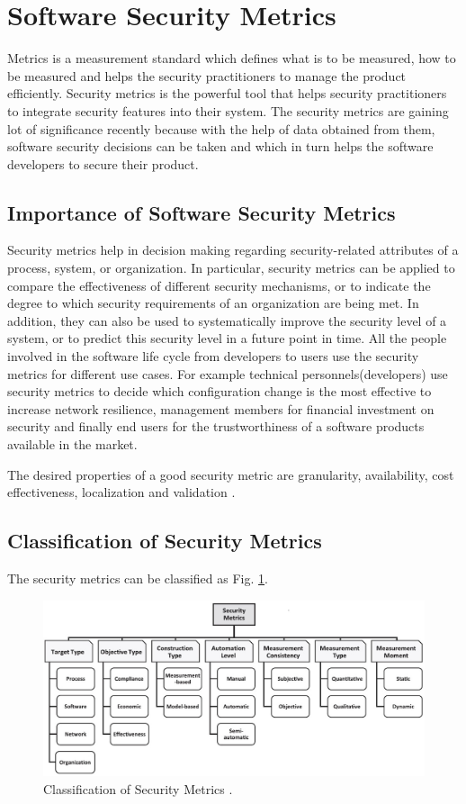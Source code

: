 \documentclass[pdftex,english,oribibl]{llncs}
\begin{document}
\section{Software Security Metrics}\label{sec:softwaremetrics}
Metrics is a measurement standard which defines what is to be measured, how to be measured and helps the security practitioners to manage the product efficiently. Security metrics is the powerful tool that helps security practitioners to integrate security features into their system. The security metrics are gaining lot of significance recently because with the help of data obtained from them, software security decisions can be taken and which in turn helps the software developers to secure their product. 

\subsection{Importance of Software Security Metrics}
Security metrics help in decision making regarding security-related attributes of a process, system, or organization. In particular, security metrics can be applied to compare the effectiveness of different security mechanisms, or to indicate the degree to which security requirements of an organization are being met. In addition, they can also be used to systematically improve the security level of a system, or to predict this security level in a future point in time. All the people involved in the software life cycle from developers to users use the security metrics for different use cases. For example technical personnels(developers) use security metrics to decide which configuration change is the most effective to increase network resilience, management members for financial investment on security and finally end users for the trustworthiness of a software products available in the market.

The desired properties of a good security metric are granularity, availability, cost effectiveness, localization and validation \cite{8017389_Ramos}. 

\subsection{Classification of Security Metrics}
The security metrics can be classified as Fig. \ref{fig:security_metric_types}.

\begin{figure}[h]
	\centering\includegraphics[width=\linewidth]{figures/security_metric_types.jpg}
	\caption{Classification of Security Metrics \cite{8017389_Ramos}.}
	\label{fig:security_metric_types}
\end{figure}
\end{document}
